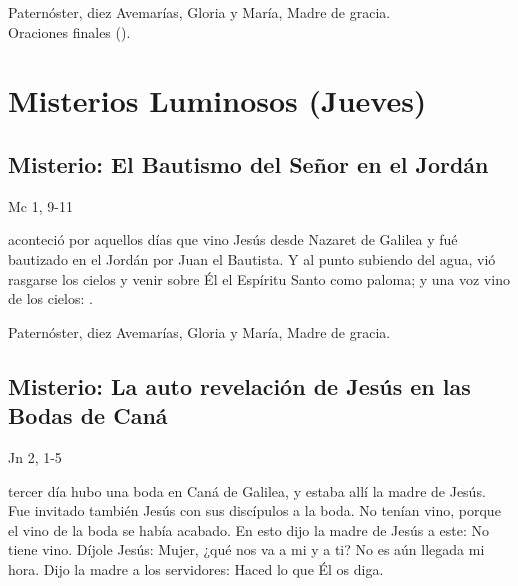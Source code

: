\documentclass[10pt,a4paper,oneside]{book}
\newcounter{lux-counter}
\begin{document}
\begin{center}
      Paternóster, diez Avemarías, Gloria y María, Madre de gracia.\\
      Oraciones finales ().
\end{center}

\section*{Misterios Luminosos (Jueves)}

\subsection*{ Misterio: El Bautismo del Señor en el Jordán}
\begin{flushright}
      {\color{red}Mc 1, 9-11}
\end{flushright}
 aconteció por aquellos días que vino Jesús desde Nazaret de Galilea y fué bautizado en el Jordán por Juan el Bautista. 
Y al punto subiendo del agua, vió rasgarse los cielos y venir sobre Él el Espíritu Santo como paloma; y una voz vino de los cielos: 
.

\begin{center}
      Paternóster, diez Avemarías, Gloria y María, Madre de gracia.
\end{center}

\subsection*{ Misterio: La auto revelación de Jesús en las Bodas de Caná}
\begin{flushright}
      {\color{red}Jn 2, 1-5}
\end{flushright}
 tercer día hubo una boda en Caná de Galilea, y estaba allí la madre de Jesús. Fue invitado también Jesús con sus discípulos a la boda. 
No tenían vino, porque el vino de la boda se había acabado. En esto dijo la madre de Jesús a este: No tiene vino. Díjole Jesús: Mujer, 
¿qué nos va a mi y a ti? No es aún llegada mi hora. Dijo la madre a los servidores: Haced lo que Él os diga.
\end{document}
